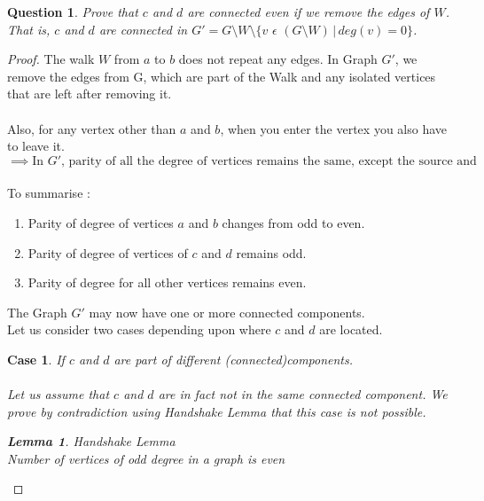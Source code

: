 \documentclass{article}
\newtheorem{case}{Case}
\newtheorem{question}{Question}
\newtheorem{lemma}{Lemma}
\begin{document}
\begin{question}
    Prove that $c$ and $d$ are connected even if we remove the edges of $W$.  That is, $c$ and $d$ are connected in $G' = G\setminus W\setminus \{v \hspace{4pt} \epsilon \hspace{4pt} (G\setminus W)\hspace{2pt} |\hspace{2pt} deg(v) = 0\}$.

\end{question}
\begin{proof}
    The walk $W$ from $a$ to $b$ does not repeat any edges. In Graph $G'$, we remove the edges from G, which are part of the Walk and any isolated vertices that are left after removing it.\\
    \\
    Also, for any vertex other than $a$ and $b$, when you enter the vertex you also have to leave it.\\
    $\implies \text{In $G'$, parity of all the degree of vertices remains the same, except the source and destination vertices.}$\\
    \\ To summarise :
    \begin{enumerate}
        \item Parity of degree of vertices $a$ and $b$ changes from odd to even.\\
        \item Parity of degree of vertices of $c$ and $d$ remains odd.\\
        \item Parity of degree for all other vertices remains even.
    \end{enumerate}
    The Graph $G'$ may now have one or more connected components.\\
    Let us consider two cases depending upon where $c$ and $d$ are located.\\
    \begin{case}
        If $c$ and $d$ are part of different (connected)components.\\
        \\
        Let us assume that $c$ and $d$ are in fact not in the same connected component. We prove by contradiction using \textit{Handshake Lemma} that this case is not possible. 
        
        \begin{lemma}  \textit{Handshake Lemma}\\
            Number of vertices of odd degree in a graph is even
        \end{lemma}
        

\end{case}
\end{proof}
\end{document}
